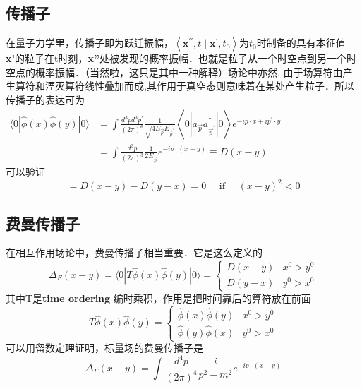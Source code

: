 \subsection{传播子}
在量子力学里，传播子即为跃迁振幅，$\left\langle\mathbf{x}^{\prime \prime}, t \mid \mathbf{x}^{\prime}, t_{0}\right\rangle$为$t_0$时制备的具有本征值\textbf{x'}的粒子在t时刻，\textbf{x''}处被发现的概率振幅．也就是粒子从一个时空点到另一个时空点的概率振幅．（当然啦，这只是其中一种解释）场论中亦然,
由于场算符由产生算符和湮灭算符线性叠加而成,其作用于真空态则意味着在某处产生粒子．所以传播子的表达可为
$\begin{aligned}\langle 0|\hat{\phi}(x) \hat{\phi}(y)| 0\rangle &=\int \frac{d^{3} p d^{3} p^{\prime}}{(2 \pi)^{6}} \frac{1}{\sqrt{4 E_{\vec{p}} E_{\vec{p}^{\prime}}}}\left\langle 0\left|a_{\vec{p}} a_{\vec{p}^{\prime}}^{\dagger}\right| 0\right\rangle e^{-i p \cdot x+i p^{\prime} \cdot y} \\ &=\int \frac{d^{3} p}{(2 \pi)^{3}} \frac{1}{2 E_{\vec{p}}} e^{-i p \cdot(x-y)} \equiv D(x-y) \end{aligned}$
\\可以验证
\begin{equation}
[\hat{\phi}(x), \hat{\phi}(y)]=D(x-y)-D(y-x)=0 \quad \text { if } \quad(x-y)^{2}<0
\end{equation}
\subsection{费曼传播子}
在相互作用场论中，费曼传播子相当重要．它是这么定义的
\begin{equation}
\Delta_{F}(x-y)=\langle 0|T \hat{\phi}(x) \hat{\phi}(y)| 0\rangle=\left\{\begin{array}{ll}
D(x-y) & x^{0}>y^{0} \\
D(y-x) & y^{0}>x^{0}
\end{array}\right.
\end{equation}
其中T是\textbf{time ordering} 编时乘积，作用是把时间靠后的算符放在前面
\begin{equation}
T \hat{\phi}(x) \hat{\phi}(y)=\left\{\begin{array}{ll}
\hat{\phi}(x) \hat{\phi}(y) & x^{0}>y^{0} \\
\hat{\phi}(y) \hat{\phi}(x) & y^{0}>x^{0}
\end{array}\right.
\end{equation}
可以用留数定理证明，标量场的费曼传播子是
\begin{equation}
\Delta_{F}(x-y)=\int \frac{d^{4} p}{(2 \pi)^{4}} \frac{i}{p^{2}-m^{2}} e^{-i p \cdot(x-y)}
\end{equation}

